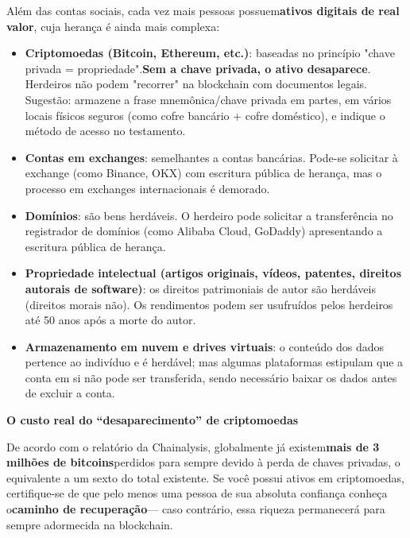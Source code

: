 
Além das contas sociais, cada vez mais pessoas possuem\textbf{ativos digitais de real valor}, cuja herança é ainda mais complexa:

\begin{itemize}
  \item \textbf{Criptomoedas (Bitcoin, Ethereum, etc.)}: baseadas no princípio "chave privada = propriedade".\textbf{Sem a chave privada, o ativo desaparece}. Herdeiros não podem "recorrer" na blockchain com documentos legais. Sugestão: armazene a frase mnemônica/chave privada em partes, em vários locais físicos seguros (como cofre bancário + cofre doméstico), e indique o método de acesso no testamento.
  \item \textbf{Contas em exchanges}: semelhantes a contas bancárias. Pode-se solicitar à exchange (como Binance, OKX) com escritura pública de herança, mas o processo em exchanges internacionais é demorado.
  \item \textbf{Domínios}: são bens herdáveis. O herdeiro pode solicitar a transferência no registrador de domínios (como Alibaba Cloud, GoDaddy) apresentando a escritura pública de herança.
  \item \textbf{Propriedade intelectual (artigos originais, vídeos, patentes, direitos autorais de software)}: os direitos patrimoniais de autor são herdáveis (direitos morais não). Os rendimentos podem ser usufruídos pelos herdeiros até 50 anos após a morte do autor.
  \item \textbf{Armazenamento em nuvem e drives virtuais}: o conteúdo dos dados pertence ao indivíduo e é herdável; mas algumas plataformas estipulam que a conta em si não pode ser transferida, sendo necessário baixar os dados antes de excluir a conta.
\end{itemize}

\textbf{O custo real do “desaparecimento” de criptomoedas}\par

De acordo com o relatório da Chainalysis, globalmente já existem\textbf{mais de 3 milhões de bitcoins}perdidos para sempre devido à perda de chaves privadas, o equivalente a um sexto do total existente. Se você possui ativos em criptomoedas, certifique-se de que pelo menos uma pessoa de sua absoluta confiança conheça o\textbf{caminho de recuperação}— caso contrário, essa riqueza permanecerá para sempre adormecida na blockchain.


